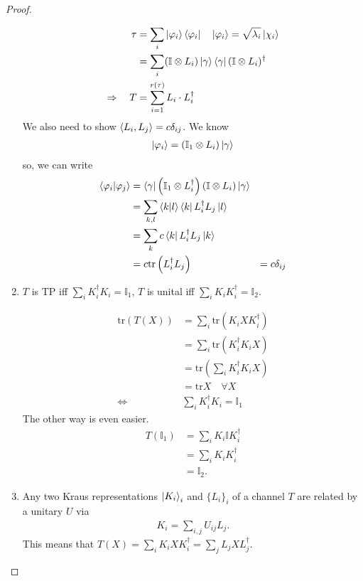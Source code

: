\documentclass[10pt,oneside,longbibliography]{report}
\begin{document}
\begin{tcolorbox}[colframe=black,breakable, colback=black!5, arc=0pt, outer arc=0pt,boxrule=0.5pt]
\begin{proof}
\begin{enumerate}
    \begin{align}
        \tau &= \sum_i \ket{\varphi_i}\bra{\varphi_i} \quad \ket{\varphi_i}=\sqrt{\lambda_i} \ket{\chi_i} \\
        &=\sum_i (\mathbb{I} \otimes L_i) \ket{\gamma}\bra{\gamma} (\mathbb{I}\otimes L_i)^{\dagger} \\
        \Rightarrow \quad  T &= \sum_{i=1}^{r(\tau)}L_i \cdot L_i^{\dagger}
    \end{align}
    We also need to show $\braket{L_i,L_j}=c \delta_{ij}$. We know
    \begin{align}
        \ket{\varphi_i} = (\mathbb{I}_1 \otimes L_i)\ket{\gamma}
    \end{align}
    so, we can write
    \begin{align}
        \braket{\varphi_i|\varphi_j}&= \bra{\gamma}\left(\mathbb{I}_1 \otimes L_i^{\dagger}\right)\left(\mathbb{I}\otimes L_i\right)\ket{\gamma} \\
        &= \sum_{k,l} \braket{k|l} \bra{k}L_i^{\dagger} L_j \ket{l}\\
        &= \sum_k c \bra{k} L_i^{\dagger}L_j \ket{k} \\
        &= c\text{tr}\left(L_i^{\dagger} L_j\right)
        &= c \delta_{ij}
    \end{align}
    
    \item $T$ is TP iff $\sum_i K_i^{\dagger}K_i = \mathbb{I}_1$, $T$ is unital iff $\sum_i K_i K_i^{\dagger} = \mathbb{I}_2$.
    
    \begin{align}
        \text{tr}(T(X)) &= \sum_i \text{tr} \left(K_i X K_i^{\dagger}\right) \\
        &= \sum_i \text{tr} \left(K_i^{\dagger} K_i X\right)\\
        &= \text{tr}\left(\sum_i K_i^{\dagger} K_i X\right) \\
        &=\text{tr}X \quad \forall X\\
        \Leftrightarrow & \sum_i K_i^{\dagger}K_i = \mathbb{I}_1
    \end{align}
    The other way is even easier. 
    \begin{align}
        T(\mathbb{I}_1) &= \sum_i K_i \mathbb{I} K_i^{\dagger} \\
        &= \sum_i K_i K_i^{\dagger} \\
        &= \mathbb{I}_2.
    \end{align}
    
    \item Any two Kraus representations $\ket{K_i}_i$ and $\{L_i\}_i$ of a channel $T$ are related by a unitary $U$ via 
    \begin{align}
        K_i = \sum_{i,j} U_{ij}L_j.
    \end{align}
    This means that $T(X)=\sum_i K_i X K_i^{\dagger} = \sum_j L_j X L_j^{\dagger}$.
    

\end{enumerate}
\end{proof}
\end{tcolorbox}
\end{document}
